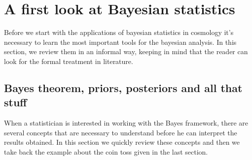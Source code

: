 \documentclass[onecolumn,           %
               showpacs,            %
               preprintnumbers,     %
               aps,                 %
               prl,          	    %
               letterpaper,             %
               superscriptaddress,      %
               nofootinbib,         %
               tightenlines,        %
               floats,floatfix      %
               ,usenatbib,
               ]{revtex4-1}
\begin{document}

\section{A first look at Bayesian statistics}

Before we start with the applications of bayesian statistics in cosmology it's necessary to learn the most important tools for the bayesian analysis. In this section, we review them in an informal way, keeping in mind that the reader can look for the formal treatment in literature.   

\subsection{Bayes theorem, priors, posteriors and all that stuff}\label{BTPP}

When a statistician is interested in working with the Bayes framework, there are several concepts that are necessary to understand before he can interpret the results obtained. In this section we quickly review these concepts and then we take back the example about the coin toss given in the last section. 
\end{document}
